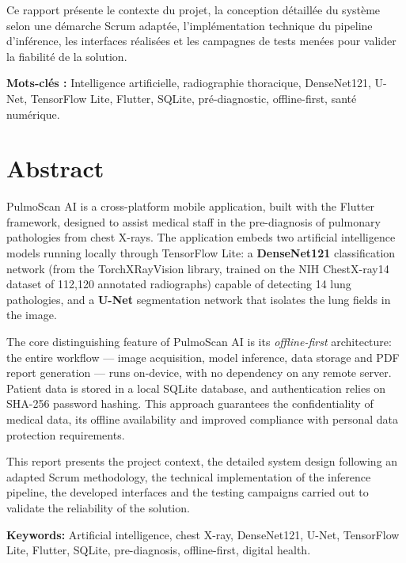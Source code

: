 \documentclass[12pt,a4paper]{report}
\begin{document}
\bigskip
Ce rapport présente le contexte du projet, la conception détaillée du système selon une démarche Scrum adaptée, l'implémentation technique du pipeline d'inférence, les interfaces réalisées et les campagnes de tests menées pour valider la fiabilité de la solution.

\medskip
\noindent\textbf{Mots-clés :} Intelligence artificielle, radiographie thoracique, DenseNet121, U-Net, TensorFlow Lite, Flutter, SQLite, pré-diagnostic, offline-first, santé numérique.

\chapter*{Abstract}
\thispagestyle{plain}

PulmoScan AI is a cross-platform mobile application, built with the Flutter framework, designed to assist medical staff in the pre-diagnosis of pulmonary pathologies from chest X-rays. The application embeds two artificial intelligence models running locally through TensorFlow Lite: a \textbf{DenseNet121} classification network (from the TorchXRayVision library, trained on the NIH ChestX-ray14 dataset of 112,120 annotated radiographs) capable of detecting 14 lung pathologies, and a \textbf{U-Net} segmentation network that isolates the lung fields in the image.

\bigskip
The core distinguishing feature of PulmoScan AI is its \textit{offline-first} architecture: the entire workflow --- image acquisition, model inference, data storage and PDF report generation --- runs on-device, with no dependency on any remote server. Patient data is stored in a local SQLite database, and authentication relies on SHA-256 password hashing. This approach guarantees the confidentiality of medical data, its offline availability and improved compliance with personal data protection requirements.

\bigskip
This report presents the project context, the detailed system design following an adapted Scrum methodology, the technical implementation of the inference pipeline, the developed interfaces and the testing campaigns carried out to validate the reliability of the solution.

\medskip
\noindent\textbf{Keywords:} Artificial intelligence, chest X-ray, DenseNet121, U-Net, TensorFlow Lite, Flutter, SQLite, pre-diagnosis, offline-first, digital health.

\end{document}
